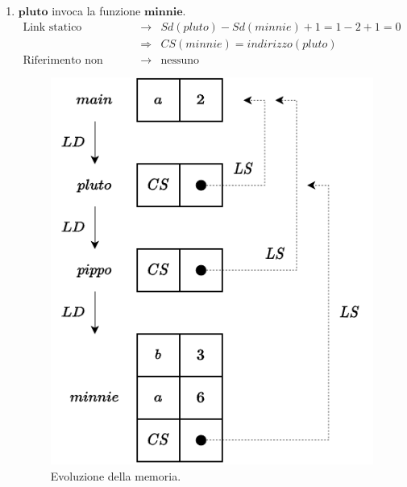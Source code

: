 \documentclass[a4paper]{article}
\begin{document}
\begin{enumerate}
		\item $\mathbf{pluto}$ invoca la funzione $\mathbf{minnie}$.
		\begin{equation*}
			\begin{array}{rcl}
				\text{Link statico} &\rightarrow& Sd(pluto) - Sd(minnie) + 1 = 1 - 2 + 1 = 0 \\ [.3em]
				&\Rightarrow& CS(minnie) = indirizzo(pluto) \\ [.3em]
				\text{Riferimento non locale} &\rightarrow& \text{nessuno}
			\end{array}
		\end{equation*}
		\begin{figure}[!htp]
			\centering
			\includegraphics[width=.6\textwidth]{img/ex3-4.pdf}
			\caption*{Evoluzione della memoria.}
		\end{figure}\newpage
		

\end{enumerate}
\end{document}
